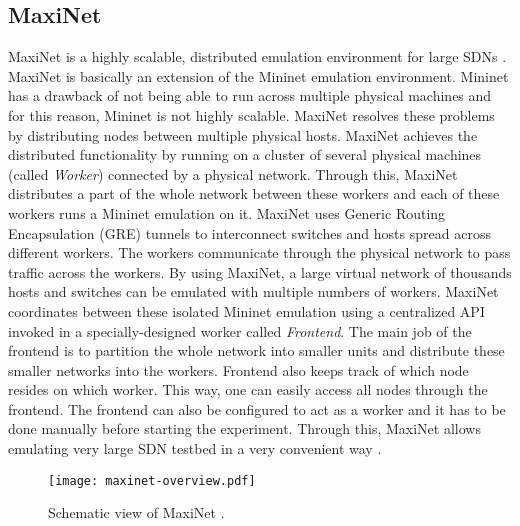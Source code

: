 \subsection{MaxiNet}\label{maxinet}
MaxiNet is a highly scalable, distributed emulation environment for large SDNs \cite{max-over}. MaxiNet is basically an extension of the Mininet emulation environment. Mininet has a drawback of not being able to run across multiple physical machines and for this reason, Mininet is not highly scalable. MaxiNet resolves these problems by distributing nodes between multiple physical hosts. MaxiNet achieves the distributed functionality by running on a cluster of several physical machines (called \textit{Worker}) connected by a physical network. Through this, MaxiNet distributes a part of the whole network between these workers and each of these workers runs a Mininet emulation on it. MaxiNet uses Generic Routing Encapsulation (GRE) tunnels to interconnect switches and hosts spread across different workers. The workers communicate through the physical network to pass traffic across the workers. By using MaxiNet, a large virtual network of thousands hosts and switches can be emulated with multiple numbers of workers. MaxiNet coordinates between these isolated Mininet emulation using a centralized API invoked in a specially-designed worker called \textit{Frontend}. The main job of the frontend is to partition the whole network into smaller units and distribute these smaller networks into the workers. Frontend also keeps track of which node resides on which worker. This way, one can easily access all nodes through the frontend. The frontend can also be configured to act as a worker and it has to be done manually before starting the experiment. Through this, MaxiNet allows emulating very large SDN testbed in a very convenient way \cite{6857078}.

\begin{figure}[tb]
\begin{center}
	\resizebox{\textwidth}{!}
	{\texttt{[image: maxinet-overview.pdf]}}
	\caption{Schematic view of MaxiNet \cite{6857078}.}
	\label{fig:maxoverview}
\end{center}
\end{figure}

